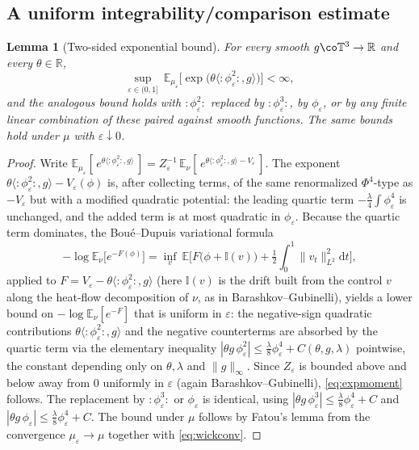 \documentclass[12pt]{article}
\newtheorem{lemma}{Lemma}
\theoremstyle{definition}
\newcommand{\T}{\mathbb{T}^3}
\newcommand{\R}{\mathbb{R}}
\newcommand{\E}{\mathbb{E}}
\newcommand{\dd}{\mathrm{d}}
\newcommand{\Wick}[1]{{:}#1{:}}
\begin{document}
\subsection{A uniform integrability/comparison estimate}

\begin{lemma}[Two-sided exponential bound]\label{lem:tightabs}
For every smooth $g\co\T\to\R$ and every $\theta\in\R$,
\begin{equation}\label{eq:expmoment}
  \sup_{\varepsilon\in(0,1]}\ \E_{\mu_\varepsilon}\!\Big[\exp\big(\theta\langle\Wick{\phi_\varepsilon^2},g\rangle\big)\Big]<\infty,
\end{equation}
and the analogous bound holds with $\Wick{\phi_\varepsilon^2}$ replaced by
$\Wick{\phi_\varepsilon^3}$, by $\phi_\varepsilon$, or by any finite linear combination of
these paired against smooth functions. The same bounds hold under $\mu$ with
$\varepsilon\downarrow0$.
\end{lemma}

\begin{proof}
Write $\E_{\mu_\varepsilon}[\,e^{\theta\langle\Wick{\phi_\varepsilon^2},g\rangle}\,]
=Z_\varepsilon^{-1}\,\E_\nu[\,e^{\theta\langle\Wick{\phi_\varepsilon^2},g\rangle-V_\varepsilon}\,]$.
The exponent
$\theta\langle\Wick{\phi_\varepsilon^2},g\rangle-V_\varepsilon(\phi)$ is, after
collecting terms, of the same renormalized $\Phi^4$-type as $-V_\varepsilon$ but with a
modified quadratic potential: the leading quartic term $-\tfrac\lambda4\int\phi_\varepsilon^4$
is unchanged, and the added term is at most quadratic in $\phi_\varepsilon$. Because the
quartic term dominates, the Boué--Dupuis variational formula
\[
  -\log\E_\nu\big[e^{-F(\phi)}\big]
  =\inf_{v}\ \E\Big[F\big(\phi+\mathbb I(v)\big)+\tfrac12\!\int_0^1\!\|v_t\|_{L^2}^2\dd t\Big],
\]
applied to $F=V_\varepsilon-\theta\langle\Wick{\phi_\varepsilon^2},g\rangle$ (here
$\mathbb I(v)$ is the drift built from the control $v$ along the heat-flow
decomposition of $\nu$, as in Barashkov--Gubinelli), yields a lower bound on
$-\log\E_\nu[e^{-F}]$ that is uniform in $\varepsilon$: the negative-sign quadratic
contributions $\theta\langle\Wick{\phi_\varepsilon^2},g\rangle$ and the negative
counterterms are absorbed by the quartic term via the elementary inequality
$|\theta g\,\phi_\varepsilon^2|\le \tfrac\lambda8\phi_\varepsilon^4+C(\theta,g,\lambda)$
pointwise, the constant depending only on $\theta,\lambda$ and $\|g\|_\infty$. Since
$Z_\varepsilon$ is bounded above and below away from $0$ uniformly in $\varepsilon$
(again Barashkov--Gubinelli), \eqref{eq:expmoment} follows. The replacement by
$\Wick{\phi_\varepsilon^3}$ or $\phi_\varepsilon$ is identical, using
$|\theta g\,\phi_\varepsilon^3|\le\tfrac\lambda8\phi_\varepsilon^4+C$ and
$|\theta g\,\phi_\varepsilon|\le\tfrac\lambda8\phi_\varepsilon^4+C$. The bound under
$\mu$ follows by Fatou's lemma from the convergence
$\mu_\varepsilon\to\mu$ together with \eqref{eq:wickconv}.
\end{proof}
\end{document}
